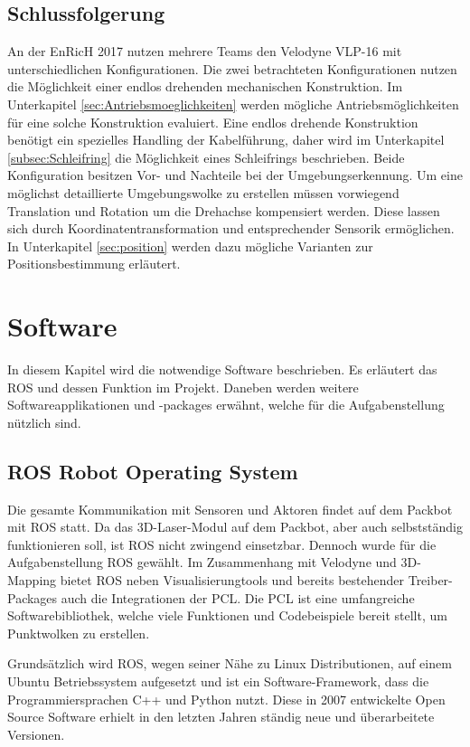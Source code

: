 \subsection{Schlussfolgerung}
An der \ac{EnRicH} 2017 nutzen mehrere Teams den Velodyne VLP-16 mit unterschiedlichen Konfigurationen. Die zwei betrachteten Konfigurationen nutzen die Möglichkeit einer endlos drehenden mechanischen Konstruktion. Im Unterkapitel \ref{sec:Antriebsmoeglichkeiten} werden mögliche Antriebsmöglichkeiten für eine solche Konstruktion evaluiert. Eine endlos drehende Konstruktion benötigt ein spezielles Handling der Kabelführung, daher wird im Unterkapitel \ref{subsec:Schleifring} die Möglichkeit eines Schleifrings beschrieben. Beide Konfiguration besitzen Vor- und Nachteile bei der Umgebungserkennung. Um eine möglichst detaillierte Umgebungswolke zu erstellen müssen vorwiegend Translation und Rotation um die Drehachse kompensiert werden. Diese lassen sich durch Koordinatentransformation und entsprechender Sensorik ermöglichen. In Unterkapitel \ref{sec:position} werden dazu mögliche Varianten zur Positionsbestimmung erläutert.
  
\section{Software}
\label{sec:Software}
In diesem Kapitel wird die notwendige Software beschrieben. Es erläutert das \ac{ROS} und dessen Funktion im Projekt. Daneben werden weitere Softwareapplikationen und -packages erwähnt, welche für die Aufgabenstellung nützlich sind.

\subsection{ROS Robot Operating System}
\label{subsec:ROS}
Die gesamte Kommunikation mit Sensoren und Aktoren findet auf dem Packbot mit \ac{ROS} statt. Da das 3D-Laser-Modul auf dem Packbot, aber auch selbstständig funktionieren soll, ist ROS nicht zwingend einsetzbar. Dennoch wurde für die Aufgabenstellung ROS gewählt. Im Zusammenhang mit Velodyne und 3D-Mapping bietet ROS neben Visualisierungtools und bereits bestehender Treiber-Packages auch die Integrationen der \ac{PCL}. Die \ac{PCL} ist eine umfangreiche Softwarebibliothek, welche viele Funktionen und Codebeispiele bereit stellt, um Punktwolken zu erstellen.

Grundsätzlich wird \ac{ROS}, wegen seiner Nähe zu Linux Distributionen, auf einem Ubuntu Betriebssystem aufgesetzt und ist ein Software-Framework, dass die Programmiersprachen C++ und Python nutzt. Diese in 2007 entwickelte Open Source Software erhielt in den letzten Jahren ständig neue und überarbeitete Versionen.

